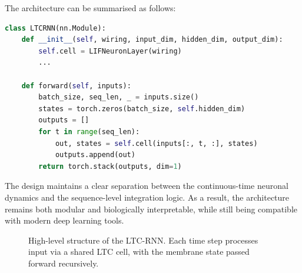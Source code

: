 \noindent The architecture can be summarised as follows:
\begin{lstlisting}[language=Python, caption={Structure of the LTCRNN module}]
class LTCRNN(nn.Module):
    def __init__(self, wiring, input_dim, hidden_dim, output_dim):
        self.cell = LIFNeuronLayer(wiring)
        ...
        
    def forward(self, inputs):
        batch_size, seq_len, _ = inputs.size()
        states = torch.zeros(batch_size, self.hidden_dim)
        outputs = []
        for t in range(seq_len):
            out, states = self.cell(inputs[:, t, :], states)
            outputs.append(out)
        return torch.stack(outputs, dim=1)
\end{lstlisting}

The design maintains a clear separation between the continuous-time neuronal dynamics and the sequence-level integration logic. As a result, the architecture remains both modular and biologically interpretable, while still being compatible with modern deep learning tools.

\begin{figure}[H]
    \centering
    \caption{High-level structure of the LTC-RNN. Each time step processes input via a shared LTC cell, with the membrane state passed forward recursively.}
    \label{fig:ltc_rnn_architecture}
\end{figure}

